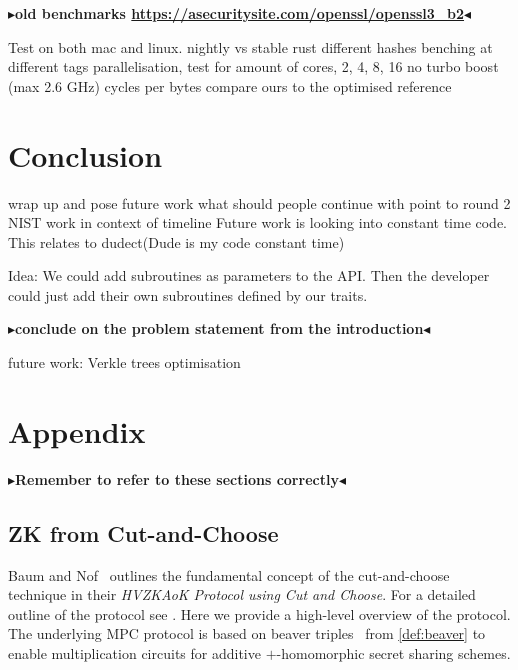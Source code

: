 \documentclass[11pt]{report}
\theoremstyle{definition}
\theoremstyle{plain}
\newcommand{\todo}[1]{{\color[rgb]{.5,0,0}\textbf{$\blacktriangleright$#1$\blacktriangleleft$}}}
\begin{document}
\todo{old benchmarks \url{https://asecuritysite.com/openssl/openssl3_b2}}

Test on both mac and linux.
nightly vs stable rust
different hashes
benching at different tags
parallelisation, test for amount of cores, 2, 4, 8, 16
no turbo boost (max 2.6 GHz)
cycles per bytes
compare ours to the optimised reference


\chapter{Conclusion}\label{ch:conclusion}

wrap up and pose future work
what should people continue with
point to round 2 NIST
work in context of timeline
Future work is looking into constant time code. This relates to dudect(Dude is my code constant time)

Idea: We could add subroutines as parameters to the API. Then the developer could just add their own subroutines defined by our traits.

\todo{conclude on the problem statement from the introduction}

future work: Verkle trees optimisation


\cleardoublepage
{}




\cleardoublepage
\appendix
\chapter{Appendix}
\todo{Remember to refer to these sections correctly}

\section{ZK from Cut-and-Choose}\label{sec:zk-cut-and-choose}

Baum and Nof~\cite{baum2020concretely} outlines the fundamental concept of the cut-and-choose technique in their \textit{HVZKAoK Protocol using Cut and Choose}. For a detailed outline of the protocol see \cite[s3.2]{baum2020concretely}. Here we provide a high-level overview of the protocol. The underlying MPC protocol is based on beaver triples~\cite{beaver1992efficient} from \autoref{def:beaver} to enable multiplication circuits for additive $+$-homomorphic secret sharing schemes.
\end{document}
